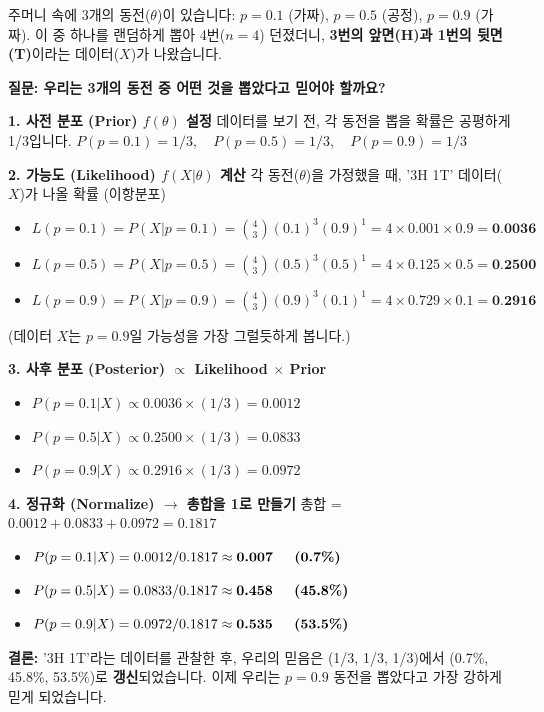 \documentclass[11pt,a4paper]{book}
\theoremstyle{definition}
\begin{document}
\begin{examplebox}[title=어떤 동전을 뽑았을까?]
    주머니 속에 3개의 동전($\theta$)이 있습니다: $p=0.1$ (가짜), $p=0.5$ (공정), $p=0.9$ (가짜).
    이 중 하나를 랜덤하게 뽑아 4번($n=4$) 던졌더니, \textbf{3번의 앞면(H)과 1번의 뒷면(T)}이라는 데이터($X$)가 나왔습니다.

    \textbf{질문: 우리는 3개의 동전 중 어떤 것을 뽑았다고 믿어야 할까요?}

    \textbf{1. 사전 분포 (Prior) $f(\theta)$ 설정}
    데이터를 보기 전, 각 동전을 뽑을 확률은 공평하게 1/3입니다.
    $P(p=0.1) = 1/3, \quad P(p=0.5) = 1/3, \quad P(p=0.9) = 1/3$

    \textbf{2. 가능도 (Likelihood) $f(X|\theta)$ 계산}
    각 동전($\theta$)을 가정했을 때, '3H 1T' 데이터($X$)가 나올 확률 (이항분포)
    \begin{itemize}
        \item $L(p=0.1) = P(X|p=0.1) = \binom{4}{3} (0.1)^3 (0.9)^1 = 4 \times 0.001 \times 0.9 = \textbf{0.0036}$
        \item $L(p=0.5) = P(X|p=0.5) = \binom{4}{3} (0.5)^3 (0.5)^1 = 4 \times 0.125 \times 0.5 = \textbf{0.2500}$
        \item $L(p=0.9) = P(X|p=0.9) = \binom{4}{3} (0.9)^3 (0.1)^1 = 4 \times 0.729 \times 0.1 = \textbf{0.2916}$
    \end{itemize}
    (데이터 $X$는 $p=0.9$일 가능성을 가장 그럴듯하게 봅니다.)

    \textbf{3. 사후 분포 (Posterior) $\propto$ Likelihood $\times$ Prior}
    \begin{itemize}
        \item $P(p=0.1|X) \propto 0.0036 \times (1/3) = 0.0012$
        \item $P(p=0.5|X) \propto 0.2500 \times (1/3) = 0.0833$
        \item $P(p=0.9|X) \propto 0.2916 \times (1/3) = 0.0972$
    \end{itemize}

    \textbf{4. 정규화 (Normalize) $\rightarrow$ 총합을 1로 만들기}
    총합 = $0.0012 + 0.0833 + 0.0972 = 0.1817$
    \begin{itemize}
        \item $P(p=0.1|X) = 0.0012 / 0.1817 \approx \textbf{0.007 \quad (0.7\%)}$
        \item $P(p=0.5|X) = 0.0833 / 0.1817 \approx \textbf{0.458 \quad (45.8\%)}$
        \item $P(p=0.9|X) = 0.0972 / 0.1817 \approx \textbf{0.535 \quad (53.5\%)}$
    \end{itemize}

    \textbf{결론:} '3H 1T'라는 데이터를 관찰한 후, 우리의 믿음은 (1/3, 1/3, 1/3)에서 (0.7\%, 45.8\%, 53.5\%)로 \textbf{갱신}되었습니다. 이제 우리는 $p=0.9$ 동전을 뽑았다고 가장 강하게 믿게 되었습니다.
\end{examplebox}
\end{document}

